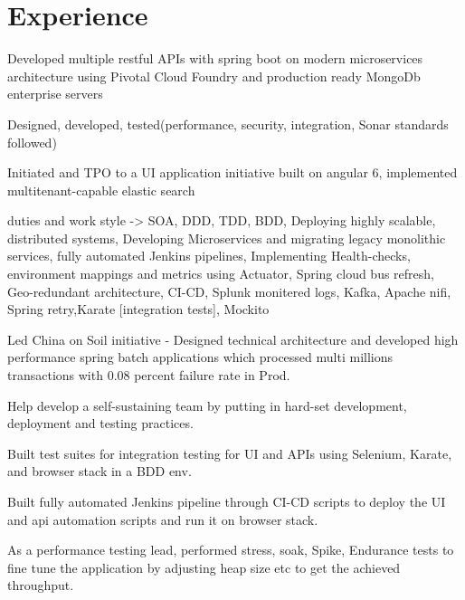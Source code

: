 \documentclass[]{deedy-resume-openfont}
\begin{document}
\begin{minipage}[t]{0.33\textwidth}
%
%

\end{minipage} 
\hfill
\begin{minipage}[t]{0.66\textwidth} 


\section{Experience}
\vspace{\topsep} %
\begin{tightemize}
\item Developed multiple restful APIs with spring boot on modern microservices architecture using Pivotal Cloud Foundry and production ready MongoDb enterprise servers
\item Designed, developed, tested(performance, security, integration, Sonar standards followed)
\item Initiated and TPO to a UI application initiative built on angular 6, implemented  multitenant-capable elastic search
\item duties and work style -> SOA, DDD, TDD, BDD, Deploying highly scalable, distributed systems, Developing Microservices and migrating legacy monolithic services, fully automated Jenkins pipelines, Implementing Health-checks, environment mappings and metrics using Actuator, Spring cloud bus refresh, Geo-redundant architecture, CI-CD, Splunk monitered logs, Kafka, Apache nifi, Spring retry,Karate [integration tests], Mockito
\item Led China on Soil initiative - Designed technical architecture and developed high performance spring batch applications which processed multi millions transactions with 0.08 percent failure rate in Prod.
\item Help develop a self-sustaining team by putting in hard-set development, deployment and testing practices.
\end{tightemize}
\sectionsep

\vspace{\topsep} %
\begin{tightemize}
\item Built test suites for integration testing for UI and APIs using Selenium, Karate, and browser stack in a BDD env.
\item Built fully automated Jenkins pipeline through CI-CD scripts to deploy the UI and api automation scripts and run it on browser stack.
\item As a performance testing lead, performed stress, soak, Spike, Endurance tests to fine tune the application by adjusting heap size etc to get the achieved throughput.
\end{tightemize}
\sectionsep


\end{minipage}
\end{document}
